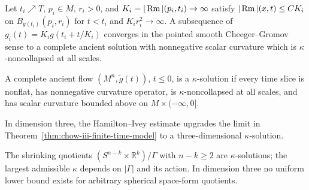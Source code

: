 \begin{theorem}
\label{thm:chow-iii-finite-time-model}


Let $t_i\nearrow T$, $p_i\in M$, $r_i>0$, and
$K_i=|\operatorname{Rm}|(p_i,t_i)\to\infty$ satisfy
$|\operatorname{Rm}|(x,t)\le CK_i$ on $B_{g(t_i)}(p_i,r_i)$ for $t<t_i$ and
$K_i r_i^2\to\infty$.  A subsequence of
$g_i(t)=K_i g(t_i+t/K_i)$ converges in the pointed smooth
Cheeger--Gromov sense to a complete ancient solution with nonnegative scalar
curvature which is $\kappa$-noncollapsed at all scales.
\end{theorem}

\begin{definition}
\label{def:chow-iii-kappa-solution}


A complete ancient flow $(M^n,\tilde g(t))$, $t\le0$, is a $\kappa$-solution
if every time slice is nonflat, has nonnegative curvature operator, is
$\kappa$-noncollapsed at all scales, and has scalar curvature bounded above
on $M\times(-\infty,0]$.
\end{definition}

\begin{corollary}
\label{cor:chow-iii-3d-finite-time-model}


In dimension three, the Hamilton--Ivey estimate upgrades the limit in
Theorem~\ref{thm:chow-iii-finite-time-model} to a three-dimensional
$\kappa$-solution.
\end{corollary}

\begin{example}
\label{ex:chow-iii-cylinder-kappa}

The shrinking quotients $(S^{n-k}\times\mathbb R^k)/\Gamma$ with
$n-k\ge2$ are $\kappa$-solutions; the largest admissible $\kappa$ depends on
$|\Gamma|$ and its action.  In dimension three no uniform lower bound exists
for arbitrary spherical space-form quotients.
\end{example}

